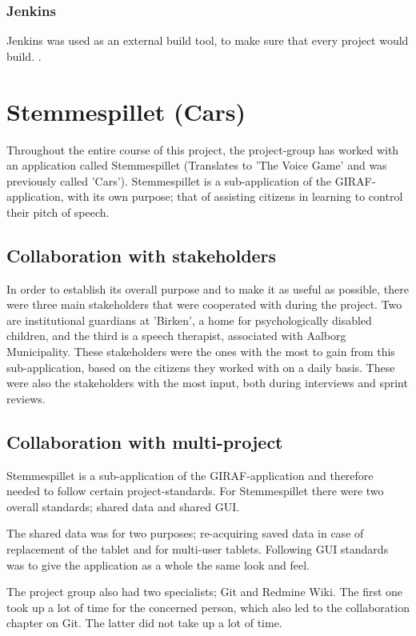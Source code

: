 \subsubsection{Jenkins}
Jenkins was used as an external build tool, to make sure that every project would build.
.

\section{Stemmespillet (Cars)}
Throughout the entire course of this project, the project-group has worked with an application called Stemmespillet (Translates to 'The Voice Game' and was previously called 'Cars').
Stemmespillet is a sub-application of the GIRAF-application, with its own purpose; that of assisting citizens in learning to control their pitch of speech.

\subsection{Collaboration with stakeholders}
In order to establish its overall purpose and to make it as useful as possible, there were three main stakeholders that were cooperated with during the project.
Two are institutional guardians at 'Birken', a home for psychologically disabled children, and the third is a speech therapist, associated with Aalborg Municipality.
These stakeholders were the ones with the most to gain from this sub-application, based on the citizens they worked with on a daily basis.
These were also the stakeholders with the most input, both during interviews and sprint reviews.

\subsection{Collaboration with multi-project}
Stemmespillet is a sub-application of the GIRAF-application and therefore needed to follow certain project-standards.
For Stemmespillet there were two overall standards; shared data and shared GUI.

The shared data was for two purposes; re-acquiring saved data in case of replacement of the tablet and for multi-user tablets.
Following GUI standards was to give the application as a whole the same look and feel.

The project group also had two specialists; Git and Redmine Wiki.
The first one took up a lot of time for the concerned person, which also led to the collaboration chapter on Git.
The latter did not take up a lot of time.